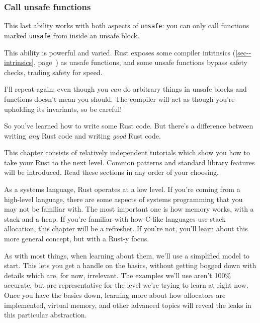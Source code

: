 \documentclass[a4paper,]{book}
\renewcommand*{\hyperref}[2][\ar]{%
  \def\ar{#2}%
  #2 (\autoref{#1}, page~\pageref{#1})}
\begin{document}
\subsubsection{Call unsafe functions}\label{call-unsafe-functions}

This last ability works with both aspects of \texttt{unsafe}: you can
only call functions marked \texttt{unsafe} from inside an unsafe block.

This ability is powerful and varied. Rust exposes some
\hyperref[sec--intrinsics]{compiler intrinsics} as unsafe functions, and
some unsafe functions bypass safety checks, trading safety for speed.

I'll repeat again: even though you \emph{can} do arbitrary things in
unsafe blocks and functions doesn't mean you should. The compiler will
act as though you're upholding its invariants, so be careful!


So you've learned how to write some Rust code. But there's a difference
between writing \emph{any} Rust code and writing \emph{good} Rust code.

This chapter consists of relatively independent tutorials which show you
how to take your Rust to the next level. Common patterns and standard
library features will be introduced. Read these sections in any order of
your choosing.


As a systems language, Rust operates at a low level. If you're coming
from a high-level language, there are some aspects of systems
programming that you may not be familiar with. The most important one is
how memory works, with a stack and a heap. If you're familiar with how
C-like languages use stack allocation, this chapter will be a refresher.
If you're not, you'll learn about this more general concept, but with a
Rust-y focus.

As with most things, when learning about them, we'll use a simplified
model to start. This lets you get a handle on the basics, without
getting bogged down with details which are, for now, irrelevant. The
examples we'll use aren't 100\% accurate, but are representative for the
level we're trying to learn at right now. Once you have the basics down,
learning more about how allocators are implemented, virtual memory, and
other advanced topics will reveal the leaks in this particular
abstraction.
\end{document}
